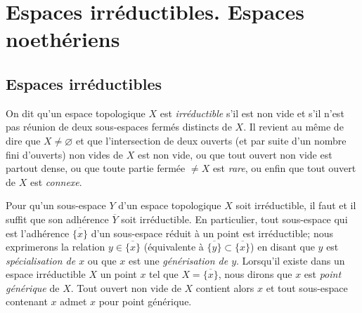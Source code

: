 
\section{Espaces irréductibles. Espaces noethériens}
\label{section:0.2-fr}

\subsection{Espaces irréductibles}
\label{subsection:0.2.1-fr}

\begin{env}[2.1.1]
\label{0.2.1.1-fr}
On dit qu'un espace topologique $X$ est \emph{irréductible} s'il est non vide
et s'il n'est pas réunion de deux sous-espaces fermés distincts de $X$. Il
revient au même de dire que $X\neq\varnothing$ et que l'intersection de deux
ouverts (et par suite d'un nombre fini d'ouverts) non vides de $X$ est non
vide, ou que tout ouvert non vide est partout dense, ou que toute partie
fermée $\neq X$ est \emph{rare}, ou enfin que tout ouvert de $X$ est
\emph{connexe}.
\end{env}

\begin{env}[2.1.2]
\label{0.2.1.2-fr}
Pour qu'un sous-espace $Y$ d'un espace topologique $X$ soit irréductible, il
faut et il suffit que son adhérence $\overline Y$ soit irréductible. En
particulier, tout sous-espace qui est l'adhérence $\overline{\{x\}}$ d'un
sous-espace réduit à un point est irréductible; nous exprimerons la relation
$y\in\overline{\{x\}}$ (équivalente à
$\overline{\{y\}}\subset\overline{\{x\}}$) en disant que $y$ est
\emph{spécialisation de $x$} ou que $x$ est une \emph{générisation de $y$}.
Lorsqu'il existe dans un espace irréductible $X$ un point $x$ tel que
$X=\overline{\{x\}}$, nous dirons que $x$ est \emph{point générique} de $X$.
Tout ouvert non vide de $X$ contient alors $x$ et tout sous-espace contenant
$x$ admet $x$ pour point générique.
\end{env}

